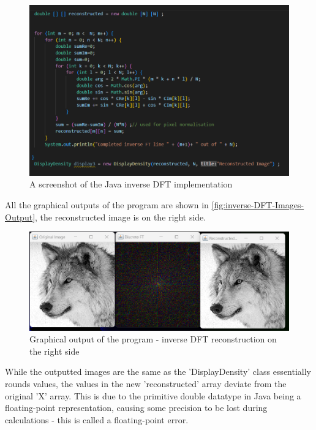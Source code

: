         \begin{figure}[H]
            \centering
            \includegraphics[width=0.9\columnwidth]{Figures/Week 1/W1-SimpleFT-InverseDFT-Implementation.png}
            \caption{A screenshot of the Java inverse DFT implementation}
            \label{fig:inverse-DFT-Code}
    \end{figure}

    All the graphical outputs of the program are shown in \autoref{fig:inverse-DFT-Images-Output}, the reconstructed image is on the right side. 
    
    \begin{figure}[H]
            \centering
            \includegraphics[width=0.8\columnwidth]{Figures/Week 1/W1-SimpleFT-InverseDFT-Graphical-Outputs.png}
            \caption{Graphical output of the program - inverse DFT reconstruction on the right side}
            \label{fig:inverse-DFT-Images-Output}
    \end{figure}

    While the outputted images are the same as the 'DisplayDensity' class essentially rounds values, the values in the new 'reconstructed' array deviate from the original 'X' array. This is due to the primitive double datatype in Java being a floating-point representation, causing some precision to be lost during calculations - this is called a floating-point error.
    
